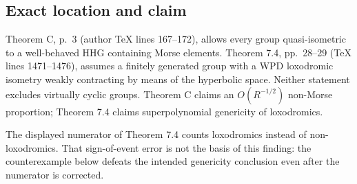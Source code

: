 \documentclass[10pt]{article}
\begin{document}
\subsection*{Exact location and claim}
Theorem C, p. 3 (author TeX lines 167–172), allows every group quasi-isometric to a well-behaved HHG containing Morse elements. Theorem 7.4, pp. 28–29 (TeX lines 1471–1476), assumes a finitely generated group with a WPD loxodromic isometry weakly contracting by means of the hyperbolic space. Neither statement excludes virtually cyclic groups. Theorem C claims an \(O(R^{-1/2})\) non-Morse proportion; Theorem 7.4 claims superpolynomial genericity of loxodromics.\par
The displayed numerator of Theorem 7.4 counts loxodromics instead of non-loxodromics. That sign-of-event error is not the basis of this finding: the counterexample below defeats the intended genericity conclusion even after the numerator is corrected.\par
\end{document}
